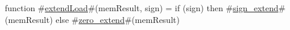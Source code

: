 function #\hyperref[sailMIPSzextendLoad]{extendLoad}#(memResult, sign) = {
  if (sign) then
    #\hyperref[sailMIPSzsignzyextend]{sign\_extend}#(memResult)
  else
    #\hyperref[sailMIPSzzzerozyextend]{zero\_extend}#(memResult)
}
